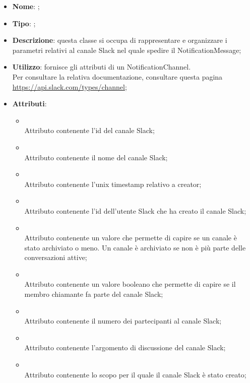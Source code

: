 \begin{itemize}
	\item \textbf{Nome}: ;
	\item \textbf{Tipo}: ;
	\item \textbf{Descrizione}: questa classe si occupa di rappresentare e organizzare i parametri relativi al canale Slack nel quale spedire il NotificationMessage;
	\item \textbf{Utilizzo}: fornisce gli attributi di un NotificationChannel. \\
Per consultare la relativa documentazione, consultare questa pagina \url{https://api.slack.com/types/channel};
	\item \textbf{Attributi}:
	\begin{itemize}
		\item[]  \\
		Attributo contenente l'id del canale Slack;
		\item[]  \\
		Attributo contenente il nome del canale Slack;
		\item[]  \\
		Attributo contenente l'unix timestamp relativo a creator;
		\item[]  \\
		Attributo contenente l'id dell'utente Slack  che ha creato il canale Slack;
		\item[]  \\
		Attributo contenente un valore che permette di capire se un canale è stato archiviato o meno.
Un canale è archiviato se non è più parte delle conversazioni attive;
		\item[]  \\
		Attributo contenente un valore booleano che permette di capire se il membro chiamante fa parte del canale Slack;
		\item[]  \\
		Attributo contenente il numero dei partecipanti al canale Slack;
		\item[]  \\
		Attributo contenente l'argomento di discussione del canale Slack;
		\item[]  \\
		Attributo contenente lo scopo per il quale il canale Slack è stato creato;
	\end{itemize}
\end{itemize}

